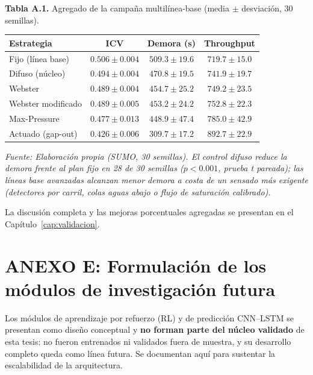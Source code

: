 \newpage
\noindent\textbf{Tabla A.1.} Agregado de la campaña multilínea-base (media $\pm$ desviación, 30 semillas).
\begin{center}
\begin{tabular}{@{}lccc@{}}
\toprule
\textbf{Estrategia} & \textbf{ICV} & \textbf{Demora (s)} & \textbf{Throughput} \\
\midrule
Fijo (línea base)   & $0.506 \pm 0.004$ & $509.3 \pm 19.6$ & $719.7 \pm 15.0$ \\
Difuso (núcleo)     & $0.494 \pm 0.004$ & $470.8 \pm 19.5$ & $741.9 \pm 19.7$ \\
Webster             & $0.489 \pm 0.004$ & $454.7 \pm 25.2$ & $749.2 \pm 23.5$ \\
Webster modificado  & $0.489 \pm 0.005$ & $453.2 \pm 24.2$ & $752.8 \pm 22.3$ \\
Max-Pressure        & $0.477 \pm 0.013$ & $448.9 \pm 47.4$ & $785.0 \pm 42.9$ \\
Actuado (gap-out)   & $0.426 \pm 0.006$ & $309.7 \pm 17.2$ & $892.7 \pm 22.9$ \\
\bottomrule
\end{tabular}
\end{center}
{\footnotesize\itshape Fuente: Elaboración propia (SUMO, 30 semillas). El control difuso reduce la demora
frente al plan fijo en 28 de 30 semillas ($p<0.001$, prueba t pareada); las líneas base avanzadas alcanzan
menor demora a costa de un sensado más exigente (detectores por carril, colas aguas abajo o flujo de
saturación calibrado).\par}

\vspace{0.4cm}
La discusión completa y las mejoras porcentuales agregadas se presentan en el
Capítulo~\ref{cap:validacion}.

\section*{ANEXO E: Formulación de los módulos de investigación futura}
\label{anexo:futuros}

Los módulos de aprendizaje por refuerzo (RL) y de predicción CNN--LSTM se presentan como diseño conceptual y
\textbf{no forman parte del núcleo validado} de esta tesis: no fueron entrenados ni validados fuera de
muestra, y su desarrollo completo queda como línea futura. Se documentan aquí para sustentar la
escalabilidad de la arquitectura.

